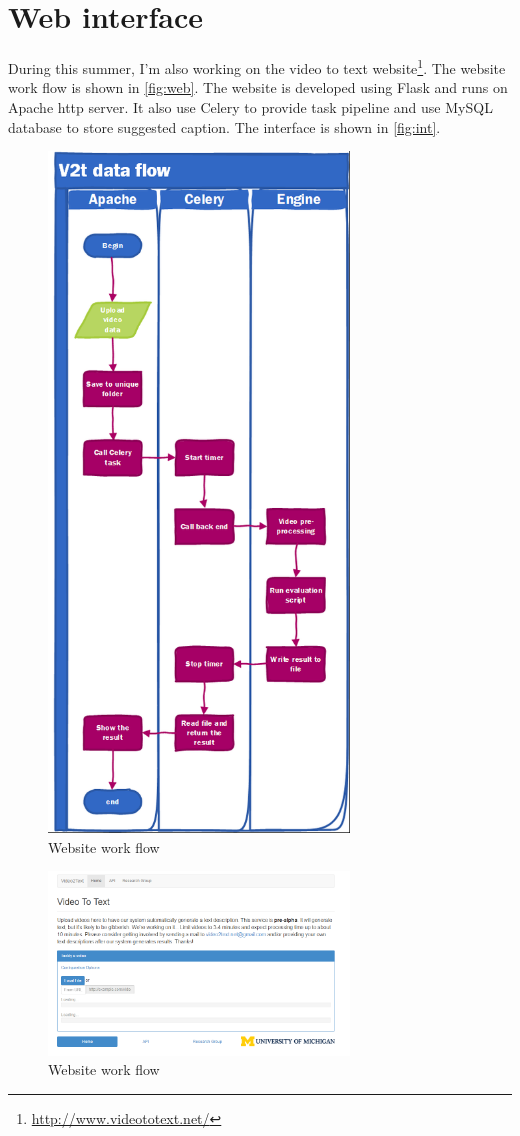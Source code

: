 \section{Web interface}
During this summer, I'm also working on the video to text website\footnote{\url{http://www.videototext.net/}}. The website work flow is shown in \autoref{fig:web}. The website is developed using Flask and runs on Apache http server. It also use Celery to provide task pipeline and use MySQL database to store suggested caption. The interface is shown in \autoref{fig:int}.

\begin{figure}
\centering
\includegraphics[width=8cm]{resources/web.png}
\caption{Website work flow}
\label{fig:web}
\end{figure}

\begin{figure}
\centering
\includegraphics[width=8cm]{resources/int.png}
\caption{Website work flow}
\label{fig:int}
\end{figure}

